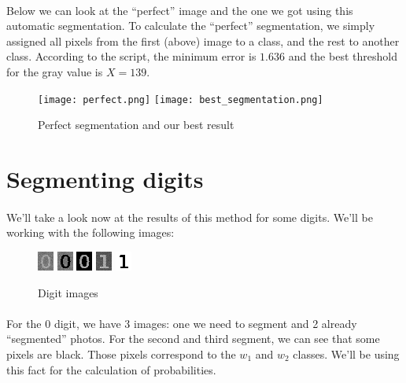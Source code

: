 \paragraph{}
Below we can look at the ``perfect'' image and the one we got using this automatic segmentation.
To calculate the ``perfect'' segmentation, we simply assigned all pixels from the first (above) image to a class, and the rest to another class.
According to the script, the minimum error is $1.636$ and the best threshold for the gray value is $X = 139$.

\begin{figure}[h]
    \centering
    \texttt{[image: perfect.png]}
    \texttt{[image: best\_segmentation.png]}
    \caption{Perfect segmentation and our best result}
    \label{}
\end{figure}


\section{Segmenting digits}
\paragraph{}
We'll take a look now at the results of this method for some digits. We'll be working with the following images:

\begin{figure}[h]
    \centering
    \includegraphics{rdf-chiffre-0-8bits.png}
    \includegraphics{rdf-chiffre-0-8bits_omega1.png}
    \includegraphics{rdf-chiffre-0-8bits_omega2.png}
    \includegraphics{rdf-chiffre-1-8bits.png}
    \includegraphics{rdf-chiffre-1-8bits_classe_a_trouver.png}
    \caption{Digit images}
    \label{}
\end{figure}

\paragraph{}
For the $0$ digit, we have 3 images: one we need to segment and 2 already ``segmented'' photos.
For the second and third segment, we can see that some pixels are black. Those pixels correspond to the $w_1$ and $w_2$ classes.
We'll be using this fact for the calculation of probabilities.

